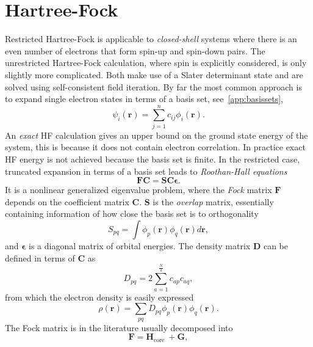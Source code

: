 \documentclass[final,3p,times,twocolumn]{elsarticle}
\begin{document}
	\section{Hartree-Fock}
	\label{app:HF}
	Restricted Hartree-Fock is applicable to \emph{closed-shell} systems where there is an even number of electrons that form spin-up and spin-down pairs. The unrestricted Hartree-Fock calculation, where spin is explicitly considered, is only slightly more complicated. Both make use of a Slater determinant state and are solved using self-consistent field iteration. By far the most common approach is to expand single electron states in terms of a basis set, see~\ref{app:basissets}, 
	\begin{equation}
		\psi_{i}(\mathbf{r})=\sum_{j=1}^{n} c_{i j} \phi_{i}(\mathbf{r}).
	\end{equation}
	An \emph{exact} HF calculation gives an upper bound on the ground state energy of the system, this is because it does not contain electron correlation. In practice exact HF energy is not achieved because the basis set is finite. In the restricted case, truncated expansion in terms of a basis set leads to \emph{Roothan-Hall equations}
	\begin{equation}
		\mathbf{F}\mathbf{C} = \mathbf{S}\mathbf{C}\mathbf{\epsilon}.
	\end{equation}
	It is a nonlinear generalized eigenvalue problem, where the \emph{Fock} matrix $\mathbf{F}$ depends on the coefficient matrix $\mathbf{C}$. $\mathbf{S}$ is the \emph{overlap} matrix, essentially containing information of how close the basis set is to orthogonality
	\begin{equation}
		S_{p q}=\int \phi_{p}(\mathbf{r}) \phi_{q}(\mathbf{r}) d \mathbf{r},
	\end{equation}
	and $\mathbf{\epsilon}$ is a diagonal matrix of orbital energies. The density matrix $\mathbf{D}$ can be defined in terms of $\mathbf{C}$ as
	\begin{equation}
		D_{p q}=2 \sum_{a=1}^{\frac{N}{2}} c_{a p} c_{a q},
	\end{equation}
	from which the electron density is easily expressed
	\begin{equation}
		\rho(\mathbf{r})=\sum_{p q} D_{p q} \phi_{p}(\mathbf{r}) \phi_{q}(\mathbf{r}).
	\end{equation}
	The Fock matrix is in the literature usually decomposed into
	\begin{equation}
		\mathbf{F}=\mathbf{H}_{\text {core }}+\mathbf{G},
	\end{equation}
\end{document}
